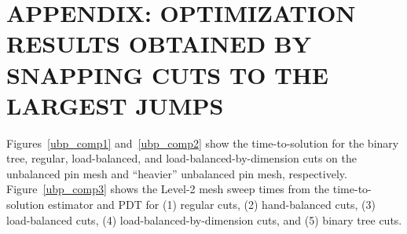 %
%
%
%



\chapter{\uppercase{Appendix: Optimization Results Obtained by snapping cuts to the largest jumps }}\label{appendix1}

Figures~\ref{ubp_comp1} and~\ref{ubp_comp2} show the time-to-solution for the binary tree, regular, load-balanced, and load-balanced-by-dimension cuts on the unbalanced pin mesh and ``heavier'' unbalanced pin mesh, respectively.
Figure~\ref{ubp_comp3} shows the Level-2 mesh sweep times from the time-to-solution estimator and PDT for (1) regular cuts, (2) hand-balanced cuts, (3) load-balanced cuts, (4) load-balanced-by-dimension cuts, and (5) binary tree cuts.

